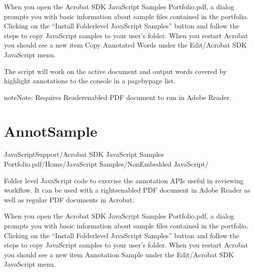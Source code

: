 \documentclass[letterpaper,12pt,english,openany,oneside]{sphinxmanual}
\begin{document}
\label{\detokenize{Samples_JavaScript:usage-1}}

When you open the Acrobat SDK JavaScript Samples Portfolio.pdf, a dialog prompts you with basic information about sample files contained in the portfolio. Clicking on the “Install Folder\sphinxhyphen{}level JavaScript Samples” button and follow the steps to copy JavaScript samples to your user’s  folder. When you restart Acrobat you should see a new item Copy Annotated Words under the Edit/Acrobat SDK JavaScript menu.

The script will work on the active document and output words covered by highlight annotations to the console in a page\sphinxhyphen{}by\sphinxhyphen{}page list.

\begin{sphinxadmonition}{note}{Note:}
Requires Reader\sphinxhyphen{}enabled PDF document to run in Adobe Reader.
\end{sphinxadmonition}


\section{AnnotSample}
\label{\detokenize{Samples_JavaScript:annotsample}}\label{\detokenize{Samples_JavaScript:location-4}}

JavaScriptSupport/Acrobat SDK JavaScript Samples Portfolio.pdf/Home/JavaScript Samples/Non\sphinxhyphen{}Embedded JavaScript/

\label{\detokenize{Samples_JavaScript:description-4}}

Folder level JavaScript code to exercise the annotation APIs useful in reviewing workflow. It can be used with a rights\sphinxhyphen{}enabled PDF document in Adobe Reader as well as regular PDF documents in Acrobat.

\label{\detokenize{Samples_JavaScript:usage-2}}

When you open the Acrobat SDK JavaScript Samples Portfolio.pdf, a dialog prompts you with basic information about sample files contained in the portfolio. Clicking on the “Install Folder\sphinxhyphen{}level JavaScript Samples” button and follow the steps to copy JavaScript samples to your user’s  folder. When you restart Acrobat you should see a new item Annotation Sample under the Edit/Acrobat SDK JavaScript menu.
\end{document}
